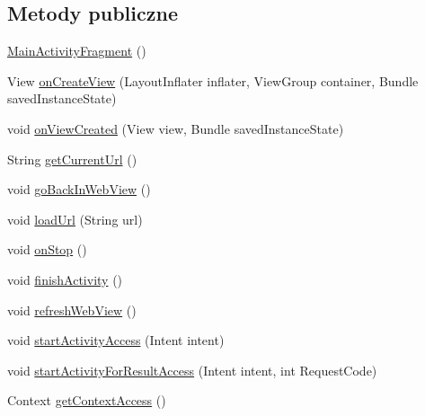 \subsection*{Metody publiczne}
\begin{DoxyCompactItemize}
\item 
\hyperlink{classpl_1_1edu_1_1uwb_1_1mobiuwb_1_1view_1_1mainactivity_1_1fragment_1_1_main_activity_fragment_a7cf38a7960d92fbb52b5d54fde78a156}{Main\+Activity\+Fragment} ()
\item 
View \hyperlink{classpl_1_1edu_1_1uwb_1_1mobiuwb_1_1view_1_1mainactivity_1_1fragment_1_1_main_activity_fragment_a314e3f11312db61112cdb03c5ea13c2a}{on\+Create\+View} (Layout\+Inflater inflater, View\+Group container, Bundle saved\+Instance\+State)
\item 
void \hyperlink{classpl_1_1edu_1_1uwb_1_1mobiuwb_1_1view_1_1mainactivity_1_1fragment_1_1_main_activity_fragment_a7e1a73426edcd557cb83cbf0b322f76c}{on\+View\+Created} (View view, Bundle saved\+Instance\+State)
\item 
String \hyperlink{classpl_1_1edu_1_1uwb_1_1mobiuwb_1_1view_1_1mainactivity_1_1fragment_1_1_main_activity_fragment_ab65af0ab3666ca0cbb2e690328794ce9}{get\+Current\+Url} ()
\item 
void \hyperlink{classpl_1_1edu_1_1uwb_1_1mobiuwb_1_1view_1_1mainactivity_1_1fragment_1_1_main_activity_fragment_a5e2d616fcda37eaa01ae8a5e5f29a4a9}{go\+Back\+In\+Web\+View} ()
\item 
void \hyperlink{classpl_1_1edu_1_1uwb_1_1mobiuwb_1_1view_1_1mainactivity_1_1fragment_1_1_main_activity_fragment_a9738299ce3576e5bb716eca78a2382ab}{load\+Url} (String url)
\item 
void \hyperlink{classpl_1_1edu_1_1uwb_1_1mobiuwb_1_1view_1_1mainactivity_1_1fragment_1_1_main_activity_fragment_ac8daeea99cb93e9acd29b02c45a6654d}{on\+Stop} ()
\item 
void \hyperlink{classpl_1_1edu_1_1uwb_1_1mobiuwb_1_1view_1_1mainactivity_1_1fragment_1_1_main_activity_fragment_a01cbacaa7664042b70d6cffe187d07a7}{finish\+Activity} ()
\item 
void \hyperlink{classpl_1_1edu_1_1uwb_1_1mobiuwb_1_1view_1_1mainactivity_1_1fragment_1_1_main_activity_fragment_a6bda1a61126d6187e4a035ffd2be2f8e}{refresh\+Web\+View} ()
\item 
void \hyperlink{classpl_1_1edu_1_1uwb_1_1mobiuwb_1_1view_1_1mainactivity_1_1fragment_1_1_main_activity_fragment_a216ca0aa7e58f27536dd7cf8f2e23369}{start\+Activity\+Access} (Intent intent)
\item 
void \hyperlink{classpl_1_1edu_1_1uwb_1_1mobiuwb_1_1view_1_1mainactivity_1_1fragment_1_1_main_activity_fragment_af733b5c03d85db55c450a668f0569b0b}{start\+Activity\+For\+Result\+Access} (Intent intent, int Request\+Code)
\item 
Context \hyperlink{classpl_1_1edu_1_1uwb_1_1mobiuwb_1_1view_1_1mainactivity_1_1fragment_1_1_main_activity_fragment_a19fb9355e8d3df54e6e863277e924c04}{get\+Context\+Access} ()
\end{DoxyCompactItemize}


